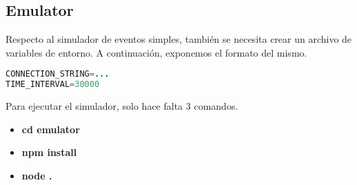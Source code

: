 \subsection{Emulator}
Respecto al simulador de eventos simples, también se necesita crear un archivo de variables de entorno. A continuación, exponemos el formato del mismo.

\begin{lstlisting}[language=Java,caption={Fichero emulator/.env},captionpos=b]
CONNECTION_STRING=...
TIME_INTERVAL=30000
\end{lstlisting}

Para ejecutar el simulador, solo hace falta 3 comandos.

\begin{itemize}
    \item \textbf{cd emulator}
    \item \textbf{npm install}
    \item \textbf{node .}
\end{itemize}